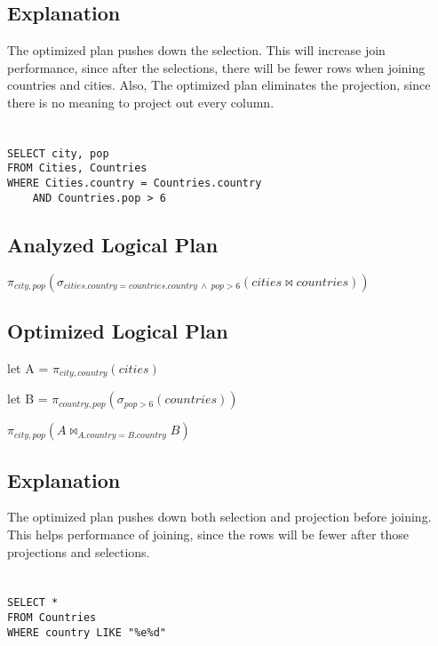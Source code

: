 \documentclass[12pt]{article}
\begin{document}
\subsection*{Explanation}
The optimized plan pushes down the selection. This will increase join performance, since after the selections, there will be fewer rows when joining countries and cities. Also, The optimized plan eliminates the projection, since there is no meaning to project out every column.

\newpage

\section{}
\begin{verbatim}
SELECT city, pop
FROM Cities, Countries
WHERE Cities.country = Countries.country
    AND Countries.pop > 6
\end{verbatim}

\subsection*{Analyzed Logical Plan}
$\pi_{city, pop}(\sigma_{cities.country = countries.country \: \land  \: pop > 6}(cities \bowtie countries))$

\subsection*{Optimized Logical Plan}
let A = $\pi_{city, country}(cities)$

let B = $\pi_{country, pop}(\sigma_{pop > 6}(countries))$

$\pi_{city, pop}(A \bowtie_{A.country = B.country} B)$

\subsection*{Explanation}
The optimized plan pushes down both selection and projection before joining. This helps performance of joining, since the rows will be fewer after those projections and selections.

\newpage

\section{}
\begin{verbatim}
SELECT *
FROM Countries
WHERE country LIKE "%e%d"
\end{verbatim}
\end{document}
